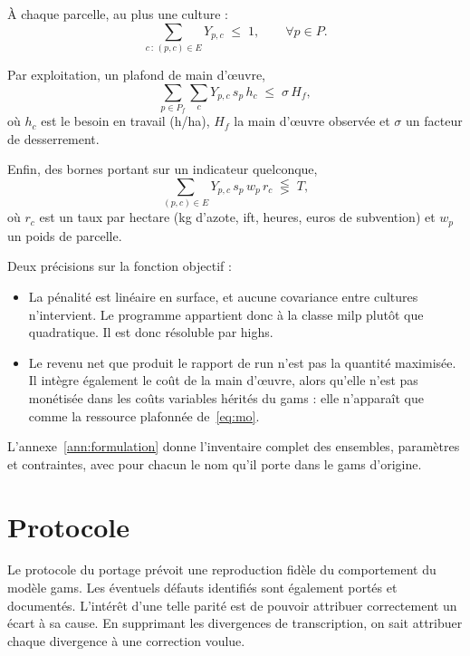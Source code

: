 À chaque parcelle, au plus une culture :
\begin{equation}
  \sum_{c \,:\, (p,c) \in E} Y_{p,c} \;\le\; 1, \qquad \forall p \in P.
  \label{eq:unicite}
\end{equation}

Par exploitation, un plafond de main d'\oe uvre,
\begin{equation}
  \sum_{p \in P_f} \sum_{c} Y_{p,c} \, s_p \, h_c \;\le\; \sigma \, H_f,
  \label{eq:mo}
\end{equation}
où $h_c$ est le besoin en travail (h/ha), $H_f$ la main d'\oe uvre observée et $\sigma$ un
facteur de desserrement.

Enfin, des bornes portant sur un indicateur quelconque,
\begin{equation}
  \sum_{(p,c) \in E} Y_{p,c} \, s_p \, w_p \, r_c \;\lesseqgtr\; T,
  \label{eq:indicateur}
\end{equation}
où $r_c$ est un taux par hectare (kg d'azote, \gls{ift}, heures, euros de subvention) et $w_p$
un poids de parcelle.

Deux précisions sur la fonction objectif :
\begin{itemize}
  \item La pénalité est linéaire en surface, et aucune covariance entre cultures n'intervient. Le
    programme appartient donc à la classe \gls{milp} plutôt que quadratique. Il est donc
    résoluble par \gls{highs}.
  \item Le revenu net que produit le rapport de run n'est pas la quantité maximisée. Il intègre
    également le coût de la main d'\oe uvre, alors qu'elle n'est pas monétisée dans les
    coûts variables hérités du \gls{gams} : elle n'apparaît que comme la ressource plafonnée
    de~\eqref{eq:mo}.
\end{itemize}

L'annexe~\ref{ann:formulation} donne l'inventaire complet des ensembles, paramètres et
contraintes, avec pour chacun le nom qu'il porte dans le \gls{gams} d'origine.


\section{Protocole}
\label{sec:parite}

Le protocole du portage prévoit une reproduction fidèle du comportement du modèle \gls{gams}.
Les éventuels défauts identifiés sont également portés et documentés. L'intérêt d'une telle
parité est de pouvoir attribuer correctement un écart à sa cause. En supprimant les divergences
de transcription, on sait attribuer chaque divergence à une correction voulue.

